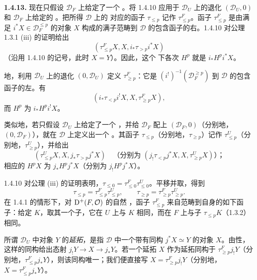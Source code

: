 \par\medskip\noindent\textbf{1.4.13.}
现在只假设 $\mathcal D_F$ 上给定了一个 。将 1.4.10 应用于 $\mathcal D_U$ 上的退化  $(\mathcal D_U,0)$ 和 $\mathcal D_F$ 上给定的 。把所得 $\mathcal D$ 上的 对应的函子 $\tau_{\le p}$ 记作 $\tau^F_{\le p}$。函子 $\tau^F_{\le p}$ 是由满足 $i^*X\in\mathcal D_F^{\le p}$ 的对象 $X$ 构成的满子范畴到 $\mathcal D$ 的包含函子的右。1.4.10 对公理 1.3.1 (iii) 的证明给出
\[
(\tau^F_{\le p}X,X,i_*\tau_{>p}i^*X)
\]
（沿用 1.4.10 的记号，此时 $X=Y$）。因此，这个 下各次 $H^p$ 就是 $i_*H^pi^*X$。

地，利用 $\mathcal D_U$ 上的退化  $(0,\mathcal D_U)$ 定义 $\tau^F_{\ge p}$：它是 $(i^!)^{-1}(\mathcal D_F^{\ge p})$ 到 $\mathcal D$ 的包含函子的左。有
\[
(i_*\tau_{<p}i^!X,X,\tau^F_{\ge p}X),
\]
而 $H^p$ 为 $i_*H^pi^!X$。

类似地，若只假设 $\mathcal D_U$ 上给定了一个 ，并给 $\mathcal D_F$ 配上  $(\mathcal D_F,0)$（分别地，$(0,\mathcal D_F)$），就在 $\mathcal D$ 上定义出一个 。其函子 $\tau_{\le p}$（分别地，$\tau_{\ge p}$）记作 $\tau^U_{\le p}$（分别地，$\tau^U_{\ge p}$），并给出
\[
(\tau^U_{\le p}X,X,j_*\tau_{>p}j^*X)
\quad\text{（分别为 }(j_!\tau_{<p}j^*X,X,\tau^U_{\ge p}X)\text{）；}
\]
相应的 $H^pX$ 为 $j_*H^pj^*X$（分别为 $j_!H^pj^*X$）。

1.4.10 对公理 (iii) 的证明表明，$\tau_{\le0}=\tau^F_{\le0}\tau^U_{\le0}$。平移并取，得到
\begin{equation*}
\tau_{\le p}=\tau^F_{\le p}\tau^U_{\le p},
\qquad\tau_{\ge p}=\tau^F_{\ge p}\tau^U_{\ge p}.\tag{1.4.13.1}
\end{equation*}
在 1.4.1 的情形下，对 $\mathrm{D}^+(F,\mathcal O)$ 的自然 ，函子 $\tau^F_{\le p}$ 来自范畴到自身的如下函子：给定 $K$，取其一个子，它在 $U$ 上与 $K$ 相同，而在 $F$ 上与子 $\tau_{\le p}K$（1.3.2）相同。

所谓 $\mathcal D_U$ 中对象 $Y$ 的\emph{延拓}，是指 $\mathcal D$ 中一个带有同构 $j^*X\simeq Y$ 的对象 $X$。由性，这样的同构给出态射 $j_!Y\to X\to j_*Y$。若一个延拓 $X$ 作为延拓同构于 $\tau^F_{\ge p}j_!Y$（分别地，$\tau^F_{\le p}j_*Y$），则该同构唯一；我们便直接写 $X=\tau^F_{\ge p}j_!Y$（分别地，$X=\tau^F_{\le p}j_*Y$）。

